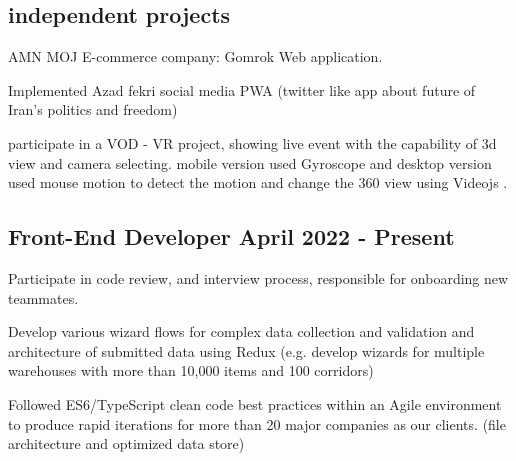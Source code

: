 \subsection{{independent projects }}

\begin{zitemize}
             \item{ 
             AMN MOJ E-commerce company: Gomrok Web application.}
             \item{
                Implemented Azad fekri social media PWA (twitter like app about future of Iran's politics and freedom)}
             \item{
                participate in a VOD - VR project, showing live event with the capability of 3d view and camera selecting. mobile version used Gyroscope and desktop version used mouse motion to detect the motion and change the 360 view using Videojs .
                }


\end{zitemize}
\subsection{{Front-End Developer \hfill April 2022 - Present}}
\begin{zitemize}
             \item{
                Participate in code review, and interview process, responsible for onboarding new teammates.}
             \item{
                Develop various wizard flows for complex data collection and validation and architecture of submitted data using Redux (e.g. develop wizards for multiple warehouses with more than 10,000 items and 100 corridors)}
             \item{
                Followed ES6/TypeScript clean code best practices within an Agile environment to produce rapid iterations for more than 20 major companies as our clients. (file architecture and optimized data store)}

\end{zitemize}


